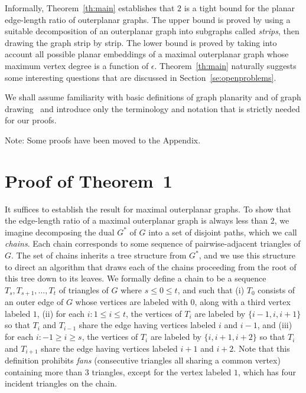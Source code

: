 \documentclass[orivec]{llncs}
\begin{document}
Informally, Theorem~\ref{th:main} establishes that $2$ is a tight bound for the planar edge-length ratio of outerplanar graphs.
The upper bound is proved by using a suitable decomposition of an outerplanar graph into subgraphs
called {\em strips}, then drawing the graph strip by strip.
The lower bound is proved by taking into account all possible planar embeddings of a maximal outerplanar graph whose maximum vertex degree is a function of $\epsilon$.  Theorem~\ref{th:main} naturally suggests some interesting questions that are discussed in
Section~\ref{se:openproblems}.

We shall assume familiarity with basic definitions of graph planarity and of graph drawing~\cite{DBLP:books/ph/BattistaETT99} and introduce only the terminology and notation that is strictly needed for our proofs.

Note: Some proofs have been moved to the Appendix.

\section{Proof of Theorem~1}\label{se:proof-Th.1}

It suffices to establish the result for maximal outerplanar graphs. To show that the edge-length ratio of a maximal outerplanar graph is always less than $2$,
we imagine decomposing the dual $G^*$ of $G$ into a set of disjoint paths, which we call {\em chains}.
Each chain corresponds to some sequence of pairwise-adjacent triangles of $G$.
The set of chains inherits a tree structure from $G^*$, and we use this structure to direct an  algorithm that draws each of the chains proceeding from the root of this tree down to its leaves.
We formally define a chain to be a sequence $T_s, T_{s+1}, \ldots, T_t$ of triangles of $G$ where $s \leq 0 \leq t$, and such that
(i) $T_0$ consists of an outer edge of $G$ whose vertices are labeled with $0$, along with a third vertex labeled $1$, 
(ii) for each $i : 1 \leq i \leq t$, the vertices of $T_i$ are labeled by $\{i-1, i, i+1\}$ so that
$T_i$ and $T_{i-1}$ share the edge having vertices labeled $i$ and $i-1$, and
(iii) for each $i : -1 \geq i \geq s$, the vertices of $T_i$ are labeled by $\{ i, i+1, i+2\}$ so that
$T_i$ and $T_{i+1}$ share the edge having vertices labeled $i+1$ and $i+2$.
Note that this definition prohibits {\em fans} (consecutive triangles all sharing a common vertex)
containing more than $3$ triangles, except for the vertex labeled $1$, which has four
incident triangles on the chain.
\end{document}
